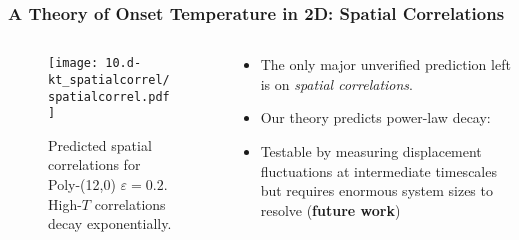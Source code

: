 \begin{frame}[c]
\frametitle{A Theory of Onset Temperature in 2D: Spatial Correlations} %

\begin{columns}[T]

\begin{column}[T]{0.45\linewidth}

\begin{figure}[t]
\begin{overprint}
    \centering\texttt{[image: 10.d-kt\_spatialcorrel/spatialcorrel.pdf]}\caption{Predicted spatial correlations for Poly-(12,0) $\varepsilon=0.2$. High-$T$ correlations decay exponentially.}
\end{overprint}
\end{figure}

\end{column}

\begin{column}{0.55\linewidth}

\begin{itemize}
    \item<1-> The only major unverified prediction left is on \textit{spatial correlations}. 
    \item<3-> Our theory predicts power-law decay:
    \item<6-> Testable by measuring displacement fluctuations at intermediate timescales but requires enormous system sizes to resolve (\textbf{future work})
\end{itemize}

\end{column}

\end{columns}

\end{frame}